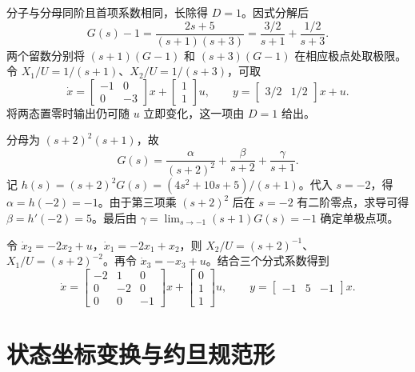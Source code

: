 

\sol 分子与分母同阶且首项系数相同，长除得 $D=1$。因式分解后
\[
G(s)-1=\frac{2s+5}{(s+1)(s+3)}
=\frac{3/2}{s+1}+\frac{1/2}{s+3}.
\]
两个留数分别将 $(s+1)(G-1)$ 和 $(s+3)(G-1)$ 在相应极点处取极限。令 $X_1/U=1/(s+1)$、$X_2/U=1/(s+3)$，可取
\[
\dot x=\begin{bmatrix}-1&0\\0&-3\end{bmatrix}x+
\begin{bmatrix}1\\1\end{bmatrix}u,\qquad
y=\begin{bmatrix}3/2&1/2\end{bmatrix}x+u.
\]
将两态置零时输出仍可随 $u$ 立即变化，这一项由 $D=1$ 给出。



\sol 分母为 $(s+2)^2(s+1)$，故
\[
G(s)=\frac{\alpha}{(s+2)^2}+\frac{\beta}{s+2}+\frac{\gamma}{s+1}.
\]
记 $h(s)=(s+2)^2G(s)=(4s^2+10s+5)/(s+1)$。代入 $s=-2$，得 $\alpha=h(-2)=-1$。由于第三项乘 $(s+2)^2$ 后在 $s=-2$ 有二阶零点，求导可得 $\beta=h'(-2)=5$。最后由 $\gamma=\lim_{s\to-1}(s+1)G(s)=-1$ 确定单极点项。

令 $\dot x_2=-2x_2+u$，$\dot x_1=-2x_1+x_2$，则 $X_2/U=(s+2)^{-1}$、$X_1/U=(s+2)^{-2}$。再令 $\dot x_3=-x_3+u$。结合三个分式系数得到
\[
\dot x=\begin{bmatrix}-2&1&0\\0&-2&0\\0&0&-1\end{bmatrix}x+
\begin{bmatrix}0\\1\\1\end{bmatrix}u,\qquad
y=\begin{bmatrix}-1&5&-1\end{bmatrix}x .
\]

\section{状态坐标变换与约旦规范形}


